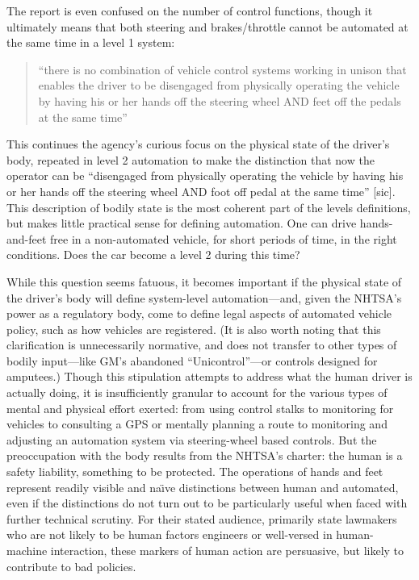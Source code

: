 The report is even confused on the number of control functions, though
it ultimately means that both steering and brakes/throttle cannot be
automated at the same time in a level 1 system: 

\begin{quote}
``there is no combination of vehicle control systems working in unison
that enables the driver to be disengaged from physically operating the
vehicle by having his or her hands off the steering wheel AND feet off
the pedals at the same time''\cite[p. 4]{NHTSA}
\end{quote}

This continues the agency's curious focus on the physical state of the
driver's body, repeated in level 2 automation to make the distinction
that now the operator can be ``disengaged from physically operating the
vehicle by having his or her hands off the steering wheel AND foot off
pedal at the same time'' [sic].\cite[p. 5]{NHTSA} This description of bodily state is
the most coherent part of the levels definitions, but makes little
practical sense for defining automation. One can drive hands-and-feet
free in a non-automated vehicle, for short periods of time, in the
right conditions. Does the car become a level 2 during this time?


While this question seems fatuous, it becomes important if the
physical state of the driver's body will define system-level
automation---and, given the NHTSA's power as a regulatory body, come
to define legal aspects of automated vehicle policy, such as how
vehicles are registered. (It is also worth
noting that this clarification is
unnecessarily normative, and does not transfer to other types of
bodily input---like GM's abandoned ``Unicontrol''\cite[p. 8]{wetmore}---or controls designed
for amputees.) Though this stipulation attempts to address what the
human driver is actually doing, it is insufficiently granular to
account for the various types of mental and physical effort exerted:
from using control stalks to monitoring for vehicles to consulting a
GPS or mentally planning a route to monitoring and adjusting an
automation system via steering-wheel based controls. But the
preoccupation with the body results from the NHTSA's charter: the
human is a safety liability, something to be protected. The operations
of hands and feet represent readily visible and na\"{\i}ve distinctions
between human and automated, even if the distinctions do not turn out
to be particularly useful when faced with further technical scrutiny.
For their stated audience, primarily state lawmakers who are not
likely to be human factors engineers or well-versed in human-machine
interaction, these markers of human action are persuasive, but likely
to contribute to bad policies.

